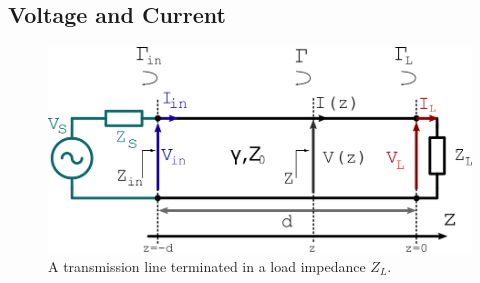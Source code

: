 \subsection{Voltage and Current}

\begin{figure}
	\includegraphics[width=1.0\textwidth]{figures/chap3/transmission_line_properties_vi}
	\caption{A transmission line terminated in a load impedance $Z_L$.}
	\label{fig:transmissionlinepropertiesvi}
\end{figure}

